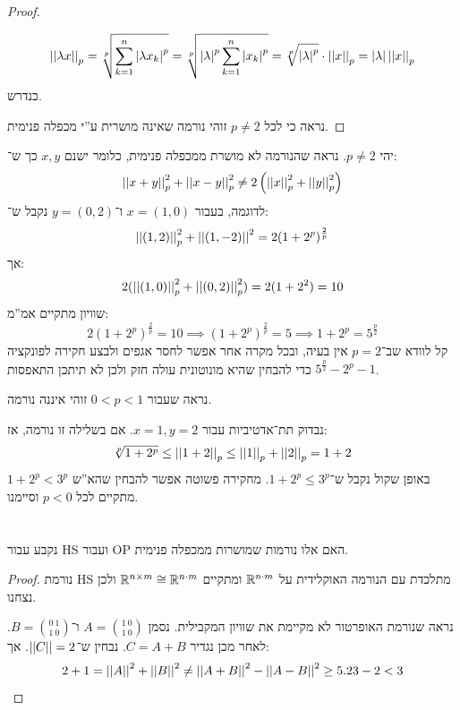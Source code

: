 \documentclass[]{../../../../../tex/classes/homework}
\begin{document}
\begin{enumerate}
\begin{proof}
\begin{itemize}
				\[ \left \vert \left \vert \lambda x \right \vert \right \vert_p = \sqrt[p]{\sum_{k = 1}^{n}\left \lvert \lambda x_k \right \rvert^{p}} = \sqrt[p]{\left \lvert \lambda \right \rvert^{p}\sum_{k = 1}^{n}\left \lvert x_k \right \rvert^{p}} = \sqrt[p]{\left \lvert \lambda \right \rvert^{p}} \cdot \left \vert \left \vert x \right \vert \right \vert_p = \left \lvert \lambda  \right \rvert\left \vert \left \vert x \right \vert \right \vert_p \]
				כנדרש. 
			\end{itemize}
			\item נראה כי לכל $ p \neq 2$ זוהי נורמה שאינה מושרית ע''י מכפלה פנימית. 
		\end{proof}
		\item יהי $p \neq 2$. נראה שהנורמה לא מושרת ממכפלה פנימית, כלומר ישנם $x, y$ כך ש־: 
		\[ \left \vert \left \vert x + y \right \vert \right \vert_p^{2} + \left \vert \left \vert x -y \right \vert \right \vert_p^{2} \neq 2 \left ( \left \vert \left \vert x \right \vert \right \vert_p^{2} + \left \vert \left \vert y \right \vert \right \vert_p^{2} \right ) \]
		לדוגמה, בעבור $x = (1, 0)$ ו־$y = (0, 2)$ נקבל ש־: 
		\[ \left \vert \left \vert (1, 2) \right \vert \right \vert_p^{2} + \left \vert \left \vert (1, -2) \right \vert \right \vert^{2} = 2(1 + 2^{p})^{\frac{2}{p}} \]
		אך: 
		\[ 2(\left \vert \left \vert (1, 0) \right \vert \right \vert_p^{2} + \left \vert \left \vert (0, 2) \right \vert \right \vert_p^{2}) = 2(1 + 2^{2}) = 10 \]
		שוויון מתקיים אמ''מ: 
		\[ 2(1 + 2^p)^{\frac{2}{p}} = 10 \implies (1 + 2^p)^{\frac{2}{p}} = 5 \implies 1 + 2^p = 5^{\frac{p}{2}} \]
		קל לוודא שב־$p =2 $ אין בעיה, ובכל מקרה אחר אפשר לחסר אגפים ולבצע חקירה לפונקציה $5^{\frac{p}{2}} - 2^{p} - 1$ כדי להבחין שהיא מונוטונית עולה חזק ולכן לא תיתכן התאפסות. 
		\item נראה שעבור $0 < p < 1$ זוהי איננה נורמה. 
		
		נבדוק תת־אדטיביות עבור $x = 1, y = 2$. אם בשלילה זו נורמה, אז:
		\[ \sqrt[p]{1 + 2^{p}} \le  \left \vert \left \vert 1 + 2 \right \vert \right \vert_p \le \left \vert \left \vert 1 \right \vert \right \vert_p + \left \vert \left \vert 2 \right \vert \right \vert_p = 1 + 2 \]
		באופן שקול נקבל ש־$1 + 2^{p} \le 3^{p}$. מחקירה פשוטה אפשר להבחין שהא''ש $1 + 2^{p} < 3^{p}$ מתקיים לכל $p < 0$ וסיימנו. 
	\end{enumerate}
	
	\section{}
	נקבע עבור HS ועבור OP האם אלו נורמות שמושרות ממכפלה פנימית. 
	\begin{proof}
		נורמת HS מתלכדת עם הנורמה האוקלידית על $\mathbb{R}^{n \cdot m}$ ומתקיים $\mathbb{R}^{n \times m} \cong \mathbb{R}^{n \cdot m}$ ולכן נצחנו. 
		
		נראה שנורמת האופרטור לא מקיימת את שוויון המקבילית. נסמן $A = \binom{1\  0}{1 \ 0}$ ו־$B= \binom{0\ 1}{1 \ 0}$. לאחר מכן נגדיר $C = A + B$. נבחין ש־$\left \vert \left \vert C \right \vert \right \vert = 2$. אך: 
		\[ 2 + 1 = \left \vert \left \vert A \right \vert \right \vert^{2} + \left \vert \left \vert B \right \vert \right \vert^{2} \neq \left \vert \left \vert A + B \right \vert \right \vert^{2} - \left \vert \left \vert A - B \right \vert \right \vert^{2} \ge 5.23 - 2 < 3 \]
	\end{proof}
	
	
	
	
	
	\ndoc
\end{document}
